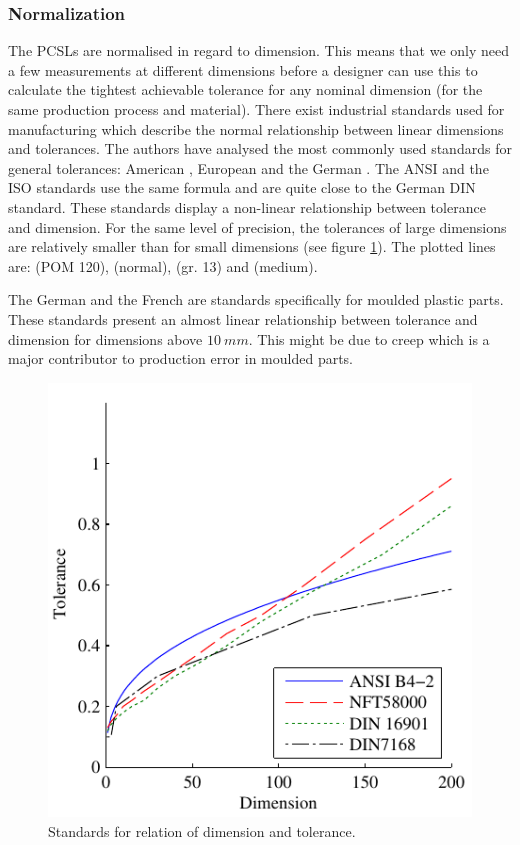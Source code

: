 \documentclass[aip,amsmath, reprint, author-year]{revtex4-1}
\begin{document}
\subsubsection{Normalization}
The PCSLs are normalised in regard to dimension. This means that we only need a few measurements at different dimensions before a designer can use this to calculate the tightest achievable tolerance for any nominal dimension (for the same production process and material). 
There exist industrial standards used for manufacturing which describe the normal relationship between linear dimensions and tolerances. The authors have analysed the most commonly used standards for general tolerances: American \citeauthor{american1978preferred}, European \citeauthor{ISO286} and the German \citeauthor{DIN7168}. The ANSI and the ISO standards use the same formula and are quite close to the German DIN standard. These standards display a non-linear relationship between tolerance and dimension. For the same level of precision, the tolerances of large dimensions are relatively smaller than for small dimensions (see figure  \ref{fig:tolstd}).
The plotted lines are: \citeauthor{DIN16901} (POM 120),  \citeauthor{NFT58000} (normal),  \citeauthor{american1978preferred} (gr. 13) and \citeauthor{DIN7168} (medium).


The German \citeauthor{DIN16901} and the French \citeauthor{NFT58000} are standards specifically for moulded plastic parts. These standards present an almost linear relationship between tolerance and dimension for dimensions above $10 \ mm$. This might be due to creep which is a major contributor to production error in moulded parts. 

\begin{figure}
\includegraphics{Tolerance_standards.pdf}
\caption{\label{fig:tolstd}Standards for relation of dimension and tolerance.}
\end{figure}
\end{document}
